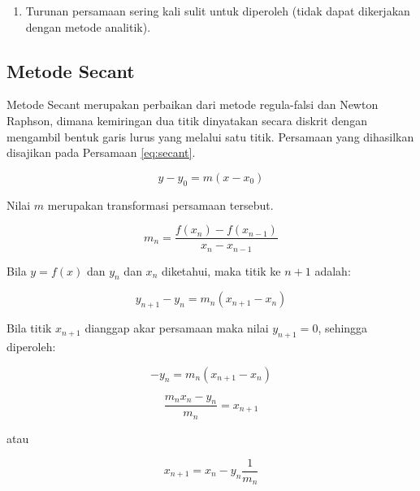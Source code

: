 \documentclass[
]{book}
\providecommand{\tightlist}{%
  \setlength{\itemsep}{0pt}\setlength{\parskip}{0pt}}
\theoremstyle{definition}
\theoremstyle{definition}
\theoremstyle{definition}
\theoremstyle{definition}
\theoremstyle{remark}
\begin{document}
\begin{enumerate}
\def\labelenumi{\arabic{enumi}.}
\setcounter{enumi}{2}
\tightlist
\item
  Turunan persamaan sering kali sulit untuk diperoleh (tidak dapat dikerjakan dengan metode analitik).
\end{enumerate}

\hypertarget{secant}{%
\subsection{Metode Secant}\label{secant}}

Metode Secant merupakan perbaikan dari metode regula-falsi dan Newton Raphson, dimana kemiringan dua titik dinyatakan secara diskrit dengan mengambil bentuk garis lurus yang melalui satu titik. Persamaan yang dihasilkan disajikan pada Persamaan \eqref{eq:secant}.

\begin{equation}
y-y_0=m\left(x-x_0\right)
  \label{eq:secant}
\end{equation}

Nilai \(m\) merupakan transformasi persamaan tersebut.

\begin{equation}
m_n=\frac{f\left(x_n\right)-f\left(x_{n-1}\right)}{x_n-x_{n-1}}
  \label{eq:secant2}
\end{equation}

Bila \(y=f\left(x\right)\) dan \(y_n\) dan \(x_n\) diketahui, maka titik ke \(n+1\) adalah:

\begin{equation}
y_{n+1}-y_n=m_n\left(x_{n+1}-x_n\right)
  \label{eq:secant3}
\end{equation}

Bila titik \(x_{n+1}\) dianggap akar persamaan maka nilai \(y_{n+1}=0\), sehingga diperoleh:

\begin{equation}
-y_n=m_n\left(x_{n+1}-x_n\right)
  \label{eq:secant4}
\end{equation}

\begin{equation}
\frac{m_nx_n-y_n}{m_n}=x_{n+1}
  \label{eq:secant5}
\end{equation}

atau

\begin{equation}
x_{n+1}=x_n-y_n\frac{1}{m_n}
  \label{eq:secant6}
\end{equation}
\end{document}
